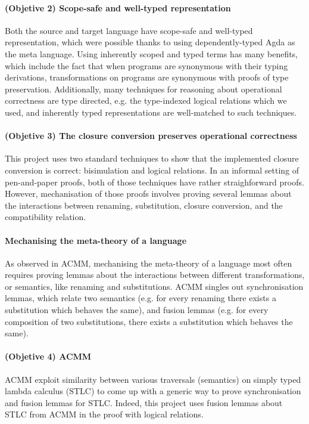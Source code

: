 \documentclass[bsc,frontabs,oneside,singlespacing,parskip,deptreport]{infthesis}
\theoremstyle{definition}
\begin{document}
\paragraph{(Objetive 2) Scope-safe and well-typed representation}
Both the source and target language have scope-safe and well-typed
representation, which were possible thanks to using dependently-typed
Agda as the meta language. Using inherently scoped and typed terms has
many benefits, which include the fact that when programs are synonymous
with their typing derivations, transformations on programs are
synonymous with proofs of type preservation. Additionally, many
techniques for reasoning about operational correctness are type
directed, e.g. the type-indexed logical relations which we used, and
inherently typed representations are well-matched to such techniques.

\paragraph{(Objetive 3) The closure conversion preserves operational correctness}
This project uses two standard techniques to show that the implemented
closure conversion is correct: bisimulation and logical relations. In
an informal setting of pen-and-paper proofs, both of those techniques
have rather straighforward proofs. However, mechanisation of those
proofs involves proving several lemmas about the interactions between
renaming, substitution, closure conversion, and the compatibility
relation.

\paragraph{Mechanising the meta-theory of a language}
As observed in ACMM, mechanising the meta-theory of a language most
often requires proving lemmas about the interactions between different
transformations, or semantics, like renaming and substitutions. ACMM
singles out synchronisation lemmas, which relate two semantics
(e.g. for every renaming there exists a substitution which behaves the
same), and fusion lemmas (e.g. for every composition of two
substitutions, there exists a substitution which behaves the
same). 

\paragraph{(Objetive 4) ACMM}
ACMM exploit similarity between various traversals (semantics) on
simply typed lambda calculus (STLC) to come up with a generic way to
prove synchronisation and fusion lemmas for STLC. Indeed, this project
uses fusion lemmas about STLC from ACMM in the proof with logical
relations.
\end{document}
